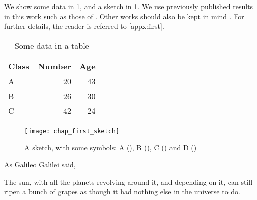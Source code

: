 We show some data in \cref{tab:chap-first-data}, and a sketch in \cref{fig:chap-first-sketch}.
We use previously published results in this work such as those of \textcite{trebin_polarons_1975}.
Other works should also be kept in mind \autocite{frohlich_electrons_1954,feynman_operator_1951}.
For further details, the reader is referred to \cref{appx:first}.
\begin{table}
  \caption{Some data in a table}
  \begin{tabular}{lrr}
    \toprule
    Class & Number & Age \\
    \midrule
    A     & 20     & 43 \\
    B     & 26     & 30 \\
    C     & 42     & 24 \\
    \bottomrule
  \end{tabular}
  \label{tab:chap-first-data}
\end{table}
\begin{figure}
  \texttt{[image: chap\_first\_sketch]}
  \caption[A sketch, with some symbols]{A sketch, with some symbols: A (\protect\blackline), B (\protect\blueline), C (\protect\blackcross) and D (\protect\blacktriangle)}
  \label{fig:chap-first-sketch}
\end{figure}

As Galileo Galilei said,

\begin{displayquote}
  The sun, with all the planets revolving around it, and depending on it, can still ripen a bunch of grapes as though it had nothing else in the universe to do.
\end{displayquote}